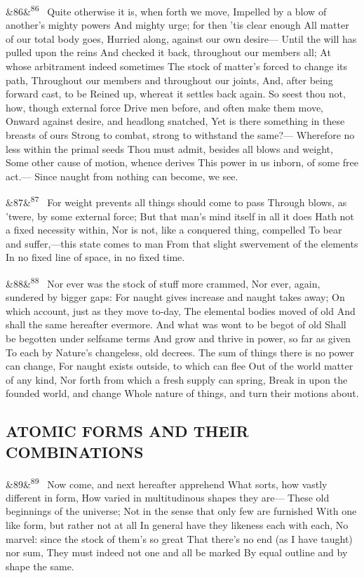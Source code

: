 \documentclass[12pt]{article}
\newcommand{\para}[1][]{\par\noindent\ifx&#1&\else\textsuperscript{\footnotesize #1}~\fi}
\begin{document}
\para[86] Quite otherwise it is, when forth we move, Impelled by a blow of another's mighty powers And mighty urge; for then 'tis clear enough All matter of our total body goes, Hurried along, against our own desire--- Until the will has pulled upon the reins And checked it back, throughout our members all; At whose arbitrament indeed sometimes The stock of matter's forced to change its path, Throughout our members and throughout our joints, And, after being forward cast, to be Reined up, whereat it settles back again. So seest thou not, how, though external force Drive men before, and often make them move, Onward against desire, and headlong snatched, Yet is there something in these breasts of ours Strong to combat, strong to withstand the same?--- Wherefore no less within the primal seeds Thou must admit, besides all blows and weight, Some other cause of motion, whence derives This power in us inborn, of some free act.--- Since naught from nothing can become, we see.

\para[87] For weight prevents all things should come to pass Through blows, as 'twere, by some external force; But that man's mind itself in all it does Hath not a fixed necessity within, Nor is not, like a conquered thing, compelled To bear and suffer,---this state comes to man From that slight swervement of the elements In no fixed line of space, in no fixed time.

\para[88] Nor ever was the stock of stuff more crammed, Nor ever, again, sundered by bigger gaps: For naught gives increase and naught takes away; On which account, just as they move to-day, The elemental bodies moved of old And shall the same hereafter evermore. And what was wont to be begot of old Shall be begotten under selfsame terms And grow and thrive in power, so far as given To each by Nature's changeless, old decrees. The sum of things there is no power can change, For naught exists outside, to which can flee Out of the world matter of any kind, Nor forth from which a fresh supply can spring, Break in upon the founded world, and change Whole nature of things, and turn their motions about.

\subsection*{ATOMIC FORMS AND THEIR COMBINATIONS}

\para[89] Now come, and next hereafter apprehend What sorts, how vastly different in form, How varied in multitudinous shapes they are--- These old beginnings of the universe; Not in the sense that only few are furnished With one like form, but rather not at all In general have they likeness each with each, No marvel: since the stock of them's so great That there's no end (as I have taught) nor sum, They must indeed not one and all be marked By equal outline and by shape the same.
\end{document}
